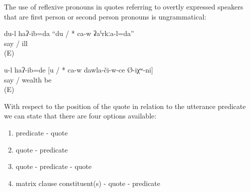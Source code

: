 The use of reflexive pronouns in quotes referring to overtly expressed speakers that are first person or second person pronouns is ungrammatical:
%
\begin{exe}
	\ex	\label{ex:‎‎‎I said that I am sick}
	\gll	du-l	haʔ-ib=da	``du	/	{*} ca-w	ʡaˁrkːa-l=da''\\
			say			/	{} 	ill\\
	\glt	{} (E)

	\ex	\label{ex:‎You said that you were rich}
	\gll	u-l	haʔ-ib=de	[u	/	{*} ca-w	dawla-či-w-ce	Ø-iχʷ-ni]\\
			say		/	{ } 	wealth	be\\
	\glt	{} (E)
\end{exe}

With respect to the position of the quote in relation to the utterance predicate we can state that there are four options available:
%
\begin{enumerate}
	\item	predicate - quote 
	\item	quote - predicate 
	\item	quote - predicate - quote 
	\item	matrix clause constituent(s) - quote - predicate 
\end{enumerate}

